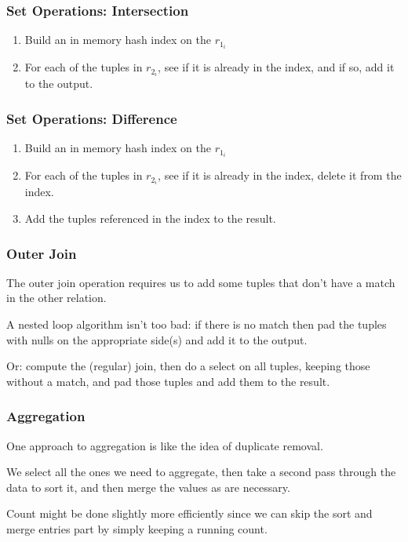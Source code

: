 \begin{frame}
\frametitle{Set Operations: Intersection}
\begin{enumerate}
		\item Build an in memory hash index on the $r_{1_{i}}$
		\item For each of the tuples in $r_{2_{i}}$, see if it is already in the index, and if so, add it to the output.
	\end{enumerate}

\end{frame}

\begin{frame}
\frametitle{Set Operations: Difference}
\begin{enumerate}
		\item Build an in memory hash index on the $r_{1_{i}}$
		\item For each of the tuples in $r_{2_{i}}$, see if it is already in the index, delete it from the index.
		\item Add the tuples referenced in the index to the result.
	\end{enumerate}

\end{frame}

\begin{frame}
\frametitle{Outer Join}

The outer join operation requires us to add some tuples that don't have a match in the other relation. 

A nested loop algorithm isn't too bad: if there is no match then pad the tuples with nulls on the appropriate side(s) and add it to the output.

Or: compute the (regular) join, then do a select on all tuples, keeping those without a match, and pad those tuples and add them to the result.


\end{frame}

\begin{frame}
\frametitle{Aggregation}

One approach to aggregation is like the idea of duplicate removal. 

We select all the ones we need to aggregate, then take a second pass through the data to sort it, and then merge the values as are necessary.

Count might be done slightly more efficiently since we can skip the sort and merge entries part by simply keeping a running count. 

\end{frame}

